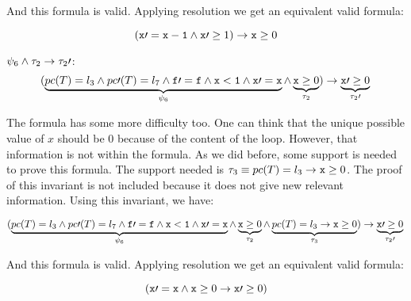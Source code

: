 	And this formula is valid. Applying resolution we get an equivalent valid formula:

	\[
		( \mathtt{x\prime =x-1} \wedge \mathtt{x\prime }\geq 1) \to \mathtt{x} \geq 0
	\]


	\; $\psi_6 \wedge \tau_2 \to \tau_2\prime $:
	\begin{equation*}
		(
			\underbrace{pc(T) = l_3 \wedge pc\prime (T) = l_7 \wedge \mathtt{f\prime =f} \wedge \mathtt{x<1} \wedge \mathtt{x\prime =x} }_{\psi_6} \wedge \underbrace{\mathtt{x} \geq 0}_{\tau_2}
		) 
			\to \underbrace{\mathtt{x}\prime  \geq 0}_{\tau_2\prime }\\\\
	\end{equation*}


	The formula has some more difficulty too.
	One can think that the unique possible value of $x$ should be $0$ because of the content of the loop.
	However, that information is not within the formula.
	As we did before, some support is needed to prove this formula.
	The support needed is $\tau_3 \equiv pc(T) = l_3 \to \mathtt{x} \geq 0$.
	The proof of this invariant is not included because it does not give new relevant information. 
	Using this invariant, we have:

	

	\begin{equation*}
		(
			\underbrace{pc(T) = l_3 \wedge pc\prime (T) = l_7 \wedge \mathtt{f\prime =f} \wedge \mathtt{x<1} \wedge \mathtt{x\prime =x}}_{\psi_6} \wedge \underbrace{\mathtt{x} \geq 0}_{\tau_2} \wedge \underbrace{pc(T) = l_3 \to \mathtt{x}\geq 0 }_{\tau_3}
		) 
			\to \underbrace{\mathtt{x}\prime  \geq 0}_{\tau_2\prime }\\\\
	\end{equation*}

	
	And this formula is valid. Applying resolution we get an equivalent valid formula:

	\[
		(
			\mathtt{x\prime =x}  \wedge \mathtt{x}\geq 0 \to \mathtt{x\prime }\geq 0
		)
	\]


